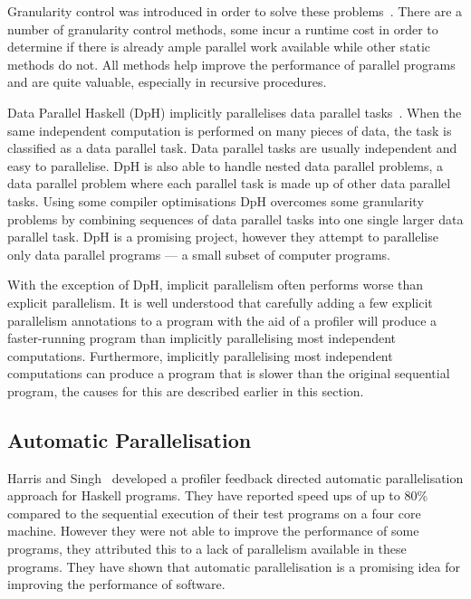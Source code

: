 Granularity control was introduced in order to solve these
problems~\cite{lopez96:distance_granularity,shen99:granularity_control}.
There are a number of granularity control methods, some incur a
runtime cost in order to determine if there is already ample parallel
work available while other static methods do not.
All methods help improve the performance of parallel programs and are
quite valuable, especially in recursive procedures.

Data Parallel Haskell (DpH) implicitly parallelises data parallel
tasks~\cite{dph:2007:status_report,
  dph:2008:harnessing_the_multicores}.
When the same independent computation is performed on many
pieces of data, the
task is classified as a data parallel task.
Data parallel tasks are usually independent and easy to parallelise.
DpH is also able to handle nested data parallel problems, a
data parallel problem where each parallel task is made up of other
data parallel tasks.
Using some compiler optimisations DpH overcomes some granularity
problems by combining sequences of data parallel tasks into one
single larger data parallel task.
DpH is a promising project,
however they attempt to parallelise only data parallel programs --- a
small subset of computer programs.

With the exception of DpH, implicit parallelism often performs worse
than explicit parallelism.
It is well understood that carefully adding a few explicit parallelism annotations
to a program with the aid of a profiler will produce a faster-running
program than implicitly parallelising most independent computations.
Furthermore, implicitly parallelising most independent computations
can produce a program that is slower than the original sequential
program, the causes for this are described earlier in this section.

\subsection{Automatic Parallelisation}
\label{sec:lit_automatic-parallelisation}

Harris and Singh~\cite{haskell-imp-par} developed a profiler feedback
directed automatic parallelisation approach for Haskell programs.
They have reported speed ups of up to 80\% compared to the sequential
execution of their test programs on a four core machine.
However they were not able to improve the performance of some
programs, they attributed this to a lack of parallelism
available in these programs.
They have shown that automatic parallelisation is a promising idea for
improving the performance of software.

